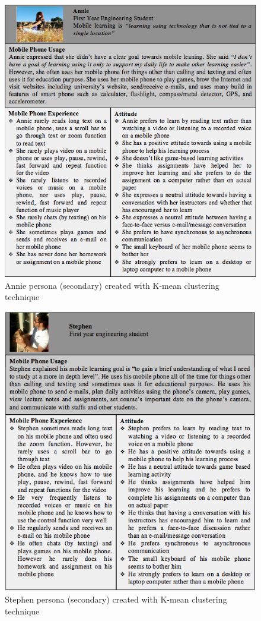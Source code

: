 \newpage 
\begin{figure}[!hbt]
\centering
\includegraphics[width=1.0 \textwidth]{annie}
\caption{Annie persona (secondary) created with K-mean clustering technique}
\end{figure}
\newpage 
\begin{figure}[!hbt]
\centering
\includegraphics[width=1.0 \textwidth]{stephen}
\caption{Stephen persona (secondary) created with K-mean clustering technique}
\end{figure}
